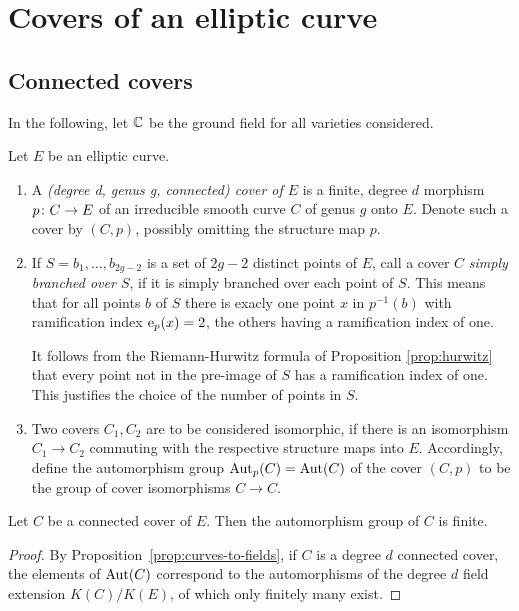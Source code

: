 \section{Covers of an elliptic curve}

\subsection{Connected covers}

In the following, let $\mathbb{C}$ be the ground field for all varieties considered.

\begin{defi} Let $E$ be an elliptic curve. 
 \begin{enumerate}
  \item A \emph{(degree d, genus g, connected) cover of $E$} is a finite, degree $d$ morphism $p\colon C\to E$ of an irreducible smooth curve $C$ of genus $g$ onto $E$. Denote such a cover by $(C,p)$, possibly omitting the structure map $p$.

  \item If $S={b_1,\dotsc,b_{2g-2}}$ is a set of $2g-2$ distinct points of $E$, call a cover $C$ \emph{simply branched over $S$}, if it is simply branched over each point of $S$. This means that for all points $b$ of $S$ there is exacly one point $x$ in $p^{-1}(b)$ with ramification index $\operatorname{e}_p(x)=2$, the others having a ramification index of one.
  
  It follows from the Riemann-Hurwitz formula of Proposition \ref{prop:hurwitz} that every point not in the pre-image of $S$ has a ramification index of one. This justifies the choice of the number of points in $S$.

  \item Two covers $C_1, C_2$ are to be considered isomorphic, if there is an isomorphism $C_1\to C_2$ commuting with the respective structure maps into $E$. Accordingly, define the automorphism group $\operatorname{Aut}_p(C)=\operatorname{Aut}(C)$ of the cover $(C,p)$ to be the group of cover isomorphisms $C\to C$. 
 \end{enumerate}
\end{defi}

\begin{prop}
 Let $C$ be a connected cover of $E$. Then the automorphism group of $C$ is finite.
\end{prop}

\begin{proof}
 By Proposition~\ref{prop:curves-to-fields}, if $C$ is a degree $d$ connected cover, the elements of $\operatorname{Aut}(C)$ correspond to the automorphisms of the degree $d$ field extension $K(C)/K(E)$, of which only finitely many exist.
\end{proof}

